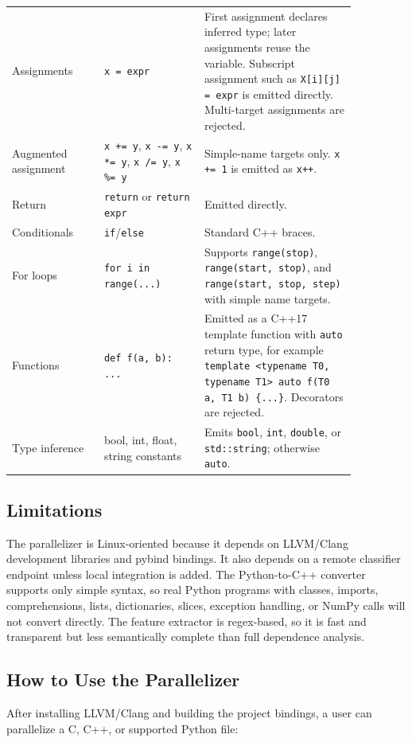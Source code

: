 \documentclass[11pt,a4paper]{article}
\begin{document}
\begin{longtable}{p{0.23\linewidth}p{0.25\linewidth}p{0.38\linewidth}}
Assignments & \texttt{x = expr} & First assignment declares inferred type;
later assignments reuse the variable. Subscript assignment such as
\texttt{X[i][j] = expr} is emitted directly. Multi-target assignments are
rejected.\\
Augmented assignment & \texttt{x += y}, \texttt{x -= y}, \texttt{x *= y},
\texttt{x /= y}, \texttt{x \%= y} & Simple-name targets only. \texttt{x += 1}
is emitted as \texttt{x++}.\\
Return & \texttt{return} or \texttt{return expr} & Emitted directly.\\
Conditionals & \texttt{if}/\texttt{else} & Standard C++ braces.\\
For loops & \texttt{for i in range(...)} & Supports \texttt{range(stop)},
\texttt{range(start, stop)}, and \texttt{range(start, stop, step)} with simple
name targets.\\
Functions & \texttt{def f(a, b): ...} & Emitted as a C++17 template function
with \texttt{auto} return type, for example
\texttt{template <typename T0, typename T1> auto f(T0 a, T1 b) \{...\}}.
Decorators are rejected.\\
Type inference & bool, int, float, string constants & Emits \texttt{bool},
\texttt{int}, \texttt{double}, or \texttt{std::string}; otherwise
\texttt{auto}.\\
\bottomrule
\end{longtable}

\subsection{Limitations}

The parallelizer is Linux-oriented because it depends on LLVM/Clang
development libraries and pybind bindings. It also depends on a remote
classifier endpoint unless local integration is added. The Python-to-C++
converter supports only simple syntax, so real Python programs with classes,
imports, comprehensions, lists, dictionaries, slices, exception handling, or
NumPy calls will not convert directly. The feature extractor is regex-based,
so it is fast and transparent but less semantically complete than full
dependence analysis.

\subsection{How to Use the Parallelizer}

After installing LLVM/Clang and building the project bindings, a user can
parallelize a C, C++, or supported Python file:
\end{document}
